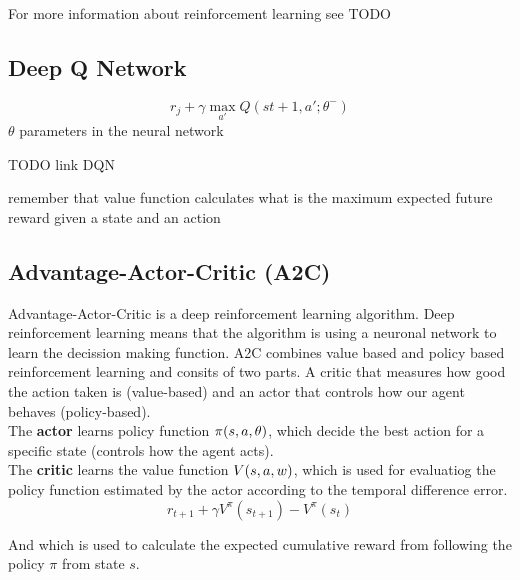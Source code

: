 
For more information about reinforcement learning see TODO


\subsection{Deep Q Network}

\begin{equation}
r_j + \gamma \max_{a'} Q(s{t+1}, a'; \theta^-)
\end{equation}
$\theta$ parameters in the neural network

TODO link DQN


remember that value function calculates what is the maximum expected future reward given a state and an action
\subsection{Advantage-Actor-Critic (A2C)}

Advantage-Actor-Critic is a deep reinforcement learning algorithm. Deep reinforcement learning means that the algorithm is using a neuronal network to learn the decission making function. A2C combines value based and policy based reinforcement learning and consits of two parts. A critic that measures how good the action taken is (value-based) and an actor that controls how our agent behaves (policy-based).\\

The \textbf{actor} learns policy function $\mathnormal{\pi(s, a, \theta)}$, which decide the best action for a specific state (controls how the agent acts).\\

The \textbf{critic} learns the value function $\mathnormal{V(s, a, w)}$, which is used for evaluatiog the policy function estimated by the actor according to the temporal difference error.
\begin{equation}
r_{t+1} + \gamma V^\pi(s_{t+1}) - V^\pi(s_t)
\end{equation}

And which is used to calculate the expected cumulative reward from following the policy $\pi$ from state $s$.\\


